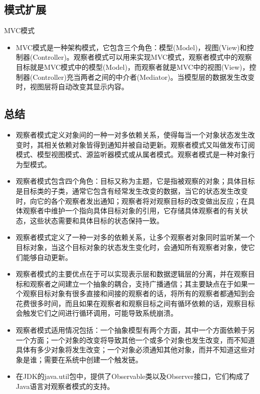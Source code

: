 \documentclass[letterpaper,10pt,english]{sphinxmanual}
\begin{document}
\subsection{模式扩展}
\label{\detokenize{behavioral_patterns/observer:id14}}
\sphinxAtStartPar
MVC模式
\begin{itemize}
\item {} 
\sphinxAtStartPar
MVC模式是一种架构模式，它包含三个角色：模型(Model)，视图(View)和控制器(Controller)。观察者模式可以用来实现MVC模式，观察者模式中的观察目标就是MVC模式中的模型(Model)，而观察者就是MVC中的视图(View)，控制器(Controller)充当两者之间的中介者(Mediator)。当模型层的数据发生改变时，视图层将自动改变其显示内容。

\end{itemize}


\subsection{总结}
\label{\detokenize{behavioral_patterns/observer:id15}}\begin{itemize}
\item {} 
\sphinxAtStartPar
观察者模式定义对象间的一种一对多依赖关系，使得每当一个对象状态发生改变时，其相关依赖对象皆得到通知并被自动更新。观察者模式又叫做发布\sphinxhyphen{}订阅模式、模型\sphinxhyphen{}视图模式、源\sphinxhyphen{}监听器模式或从属者模式。观察者模式是一种对象行为型模式。

\item {} 
\sphinxAtStartPar
观察者模式包含四个角色：目标又称为主题，它是指被观察的对象；具体目标是目标类的子类，通常它包含有经常发生改变的数据，当它的状态发生改变时，向它的各个观察者发出通知；观察者将对观察目标的改变做出反应；在具体观察者中维护一个指向具体目标对象的引用，它存储具体观察者的有关状态，这些状态需要和具体目标的状态保持一致。

\item {} 
\sphinxAtStartPar
观察者模式定义了一种一对多的依赖关系，让多个观察者对象同时监听某一个目标对象，当这个目标对象的状态发生变化时，会通知所有观察者对象，使它们能够自动更新。

\item {} 
\sphinxAtStartPar
观察者模式的主要优点在于可以实现表示层和数据逻辑层的分离，并在观察目标和观察者之间建立一个抽象的耦合，支持广播通信；其主要缺点在于如果一个观察目标对象有很多直接和间接的观察者的话，将所有的观察者都通知到会花费很多时间，而且如果在观察者和观察目标之间有循环依赖的话，观察目标会触发它们之间进行循环调用，可能导致系统崩溃。

\item {} 
\sphinxAtStartPar
观察者模式适用情况包括：一个抽象模型有两个方面，其中一个方面依赖于另一个方面；一个对象的改变将导致其他一个或多个对象也发生改变，而不知道具体有多少对象将发生改变；一个对象必须通知其他对象，而并不知道这些对象是谁；需要在系统中创建一个触发链。

\item {} 
\sphinxAtStartPar
在JDK的java.util包中，提供了Observable类以及Observer接口，它们构成了Java语言对观察者模式的支持。

\end{itemize}
\end{document}
